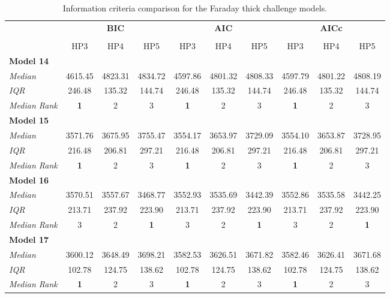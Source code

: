 \documentclass[fleqn,usenatbib]{mnras}
\begin{document}
\begin{table}
\caption{Information criteria comparison for the \cite{Sun_2015} Faraday thick challenge models. \label{tab:icthick}}
    \centering
    \begin{tabular}{@{\extracolsep{3pt}}lccccccccc@{}}
    \hline
     & \multicolumn{3}{c}{\textbf{BIC}} & \multicolumn{3}{c}{\textbf{AIC}} & \multicolumn{3}{c}{\textbf{AICc}} \\
     \cline{2-4} \cline{5-7} \cline{8-10} \\
     & HP3 & HP4 & HP5 & HP3 & HP4 & HP5 & HP3 & HP4 & HP5 \\\hline
    \textbf{Model 14} & & & & & & & & & \\
    \emph{Median} & 4615.45 & 4823.31 & 4834.72 & 4597.86 & 4801.32 & 4808.33 & 4597.79 & 4801.22 & 4808.19 \\
    \emph{IQR} & 246.48 & 135.32 & 144.74 & 246.48 & 135.32 & 144.74 & 246.48 & 135.32 & 144.74 \\
    \emph{Median Rank} & \textbf{1} & 2  & 3 & \textbf{1} & 2  & 3 & \textbf{1} & 2  & 3 \\\hline
    \textbf{Model 15} & & & & & & & & & \\
    \emph{Median} & 3571.76 & 3675.95 & 3755.47 & 3554.17 & 3653.97 & 3729.09 & 3554.10 & 3653.87 & 3728.95 \\
    \emph{IQR} & 216.48 & 206.81 & 297.21 & 216.48 & 206.81 & 297.21 & 216.48 & 206.81 & 297.21 \\
    \emph{Median Rank} & \textbf{1} & 2 & 3 & \textbf{1} & 2 & 3 & \textbf{1} & 2 & 3 \\\hline
    \textbf{Model 16} & & & & & & & & & \\
    \emph{Median} & 3570.51 & 3557.67 & 3468.77 & 3552.93 & 3535.69 & 3442.39 & 3552.86 & 3535.58 & 3442.25 \\
    \emph{IQR} & 213.71 & 237.92 & 223.90 & 213.71 & 237.92 & 223.90 & 213.71 & 237.92 & 223.90 \\
    \emph{Median Rank} & 3 & 2 & \textbf{1} & 3 & 2 & \textbf{1} & 3 & 2 & \textbf{1} \\\hline
    \textbf{Model 17} & & & & & & & & & \\
    \emph{Median} & 3600.12 & 3648.49 & 3698.21 & 3582.53 & 3626.51 & 3671.82 & 3582.46 & 3626.41 & 3671.68 \\
    \emph{IQR} & 102.78 & 124.75 & 138.62 & 102.78 & 124.75 & 138.62 & 102.78 & 124.75 & 138.62 \\
    \emph{Median Rank} & \textbf{1} & 2 & 3 & \textbf{1} & 2 & 3 & \textbf{1} & 2 & 3 \\\hline
    \end{tabular}
\end{table}






\bsp	%
\label{lastpage}
\end{document}
